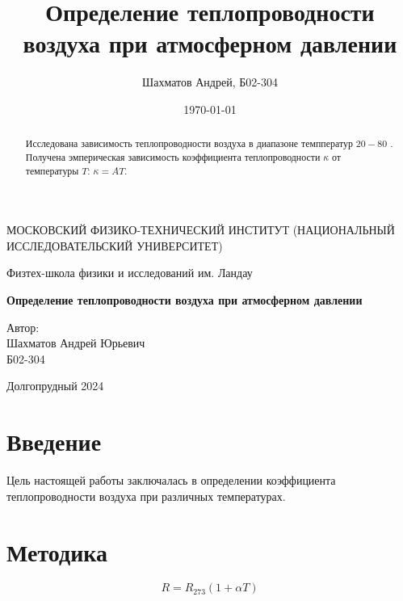 \documentclass[12pt]{article}
\title{Определение теплопроводности воздуха при атмосферном давлении}
\author{Шахматов Андрей, Б02-304}
\date{\today}
\begin{document}
\begin{titlepage}
    \begin{center}
        {\large МОСКОВСКИЙ ФИЗИКО-ТЕХНИЧЕСКИЙ ИНСТИТУТ (НАЦИОНАЛЬНЫЙ ИССЛЕДОВАТЕЛЬСКИЙ УНИВЕРСИТЕТ)}
    \end{center}
    \begin{center}
        {\large Физтех-школа физики и исследований им. Ландау}
    \end{center}
    
    
    \vspace{3cm}
    {\huge
        \begin{center}
            \textbf{Определение теплопроводности воздуха при атмосферном давлении}
        \end{center}
    }
    \vspace{2cm}
    \begin{flushright}
        {\LARGE Автор:\\ Шахматов Андрей Юрьевич \\
            \vspace{0.2cm}
            Б02-304}
    \end{flushright}
    \vspace{7 cm}
    \begin{center}
        Долгопрудный 2024
    \end{center}
\end{titlepage}


\begin{abstract}
    Исследована зависимость теплопроводности воздуха в диапазоне темпператур \(20 - 80\) \textcelsius. Получена эмперическая 
    зависимость коэффициента теплопроводности \(\kappa \) от температуры \(T\): \(\kappa = A T\).    
\end{abstract}

\tableofcontents

\section{Введение}
Цель настоящей работы заключалась в определении коэффициента теплопроводности воздуха при различных температурах.

\section{Методика}
\begin{equation}
    R = R_{273} (1 + \alpha T) 
    \label{eq:RT}
\end{equation}
\end{document}
